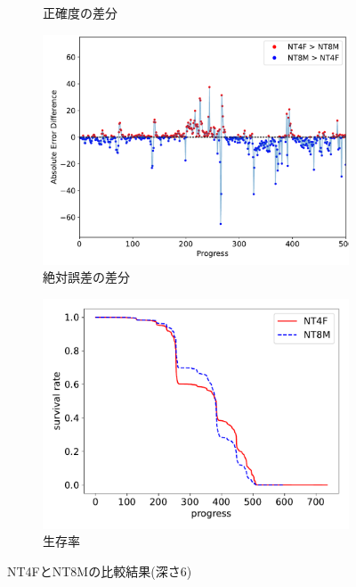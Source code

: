 \begin{figure}[t]
\begin{subfigure}[b]{0.49\linewidth}
    \caption{正確度の差分}
    \label{fig:EXP6_NT4F_and_NT8M_acc_diff}
\end{subfigure}
\begin{subfigure}[b]{0.49\linewidth}
    \includegraphics[width=\linewidth]{pdf/compare/EXP6_NT4F_and_NT8M/error_abs_diff_plot.pdf}
    \caption{絶対誤差の差分}
    \label{fig:EXP6_NT4F_and_NT8M_error_abs_diff}
\end{subfigure}
\begin{subfigure}[b]{0.49\linewidth}
    \includegraphics[width=\linewidth]{pdf/compare/EXP6_NT4F_and_NT8M/survival.pdf}
    \caption{生存率}
    \label{figEXP6_:NT4F_and_NT8M_survival}
\end{subfigure}
\caption{NT4FとNT8Mの比較結果(深さ6)}
\label{fig:EXP6_NT4FとNT8M_results}
\end{figure}
    

